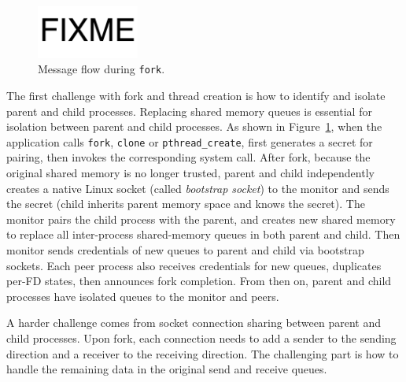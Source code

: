 \begin{figure}[t]
	\centering
	\includegraphics[width=0.3\textwidth]{images/fixme}
	\caption{Message flow during \texttt{fork}.}
	\label{fig:fork-fork}
\end{figure}


The first challenge with fork and thread creation is how to identify and isolate parent and child processes. Replacing shared memory queues is essential for isolation between parent and child processes. As shown in Figure~\ref{fig:fork-fork}, when the application calls \texttt{fork}, \texttt{clone} or \texttt{pthread\_create}, \libipc{} first generates a secret for pairing, then invokes the corresponding system call. After fork, because the original shared memory is no longer trusted, parent and child independently creates a native Linux socket (called \textit{bootstrap socket}) to the monitor and sends the secret (child inherits parent memory space and knows the secret). The monitor pairs the child process with the parent, and creates new shared memory to replace all inter-process shared-memory queues in both parent and child. Then monitor sends credentials of new queues to parent and child via bootstrap sockets. Each peer process also receives credentials for new queues, duplicates per-FD states, then announces fork completion. From then on, parent and child processes have isolated queues to the monitor and peers.

A harder challenge comes from socket connection sharing between parent and child processes. Upon fork, each connection needs to add a sender to the sending direction and a receiver to the receiving direction. The challenging part is how to handle the remaining data in the original send and receive queues.


